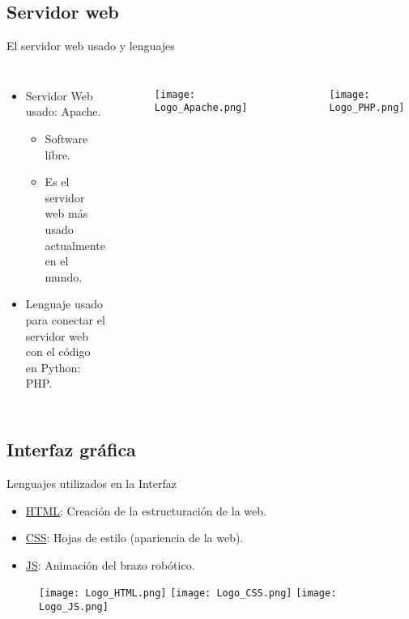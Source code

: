 \documentclass[xcolor = {dvipsnames, table}]{beamer}
\begin{document}
\subsection{Servidor web}

\begin{frame}{El servidor web usado y lenguajes}
  \begin{columns}
    \begin{itemize}
      \item Servidor Web usado: Apache.
      \begin{itemize}
        \item Software libre.
        \item Es el servidor web más usado actualmente en el mundo.
      \end{itemize}
      \item Lenguaje usado para conectar el servidor web con el código en
      Python: PHP.
    \end{itemize}
    \begin{figure}
      \centering
      \texttt{[image: Logo\_Apache.png]}
    \end{figure}
    \begin{figure}
      \centering
      \texttt{[image: Logo\_PHP.png]}
    \end{figure}
  \end{columns}
\end{frame}


\subsection{Interfaz gráfica}

\begin{frame}{Lenguajes utilizados en la Interfaz}
  \begin{itemize}
    \item \underline{HTML}: Creación de la estructuración de la web.
    \item \underline{CSS}: Hojas de estilo (apariencia de la web).
    \item \underline{JS}: Animación del brazo robótico.
  \end{itemize}
  \vspace{.75cm}
  \begin{figure}[b]
    \centering
    \texttt{[image: Logo\_HTML.png]}
    \hspace{.1\textwidth}
    \texttt{[image: Logo\_CSS.png]}
    \hspace{.1\textwidth}
    \texttt{[image: Logo\_JS.png]}
  \end{figure}
\end{frame}
\end{document}
